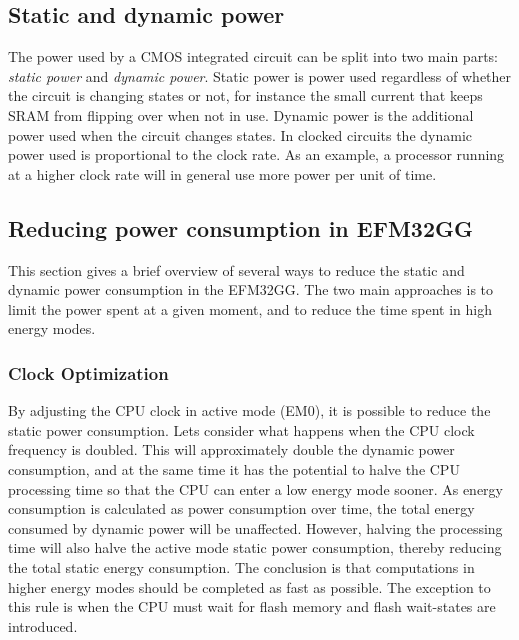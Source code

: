 \subsection{Static and dynamic power}
The power used by a CMOS integrated circuit can be split into two main parts: \emph{static power} and \emph{dynamic power}. Static power is power used regardless of whether the circuit is changing states or not, for instance the small current that keeps SRAM from flipping over when not in use. Dynamic power is the additional power used when the circuit changes states. In clocked circuits the dynamic power used is proportional to the clock rate. As an example, a processor running at a higher clock rate will in general use more power per unit of time.\cite{efm32-energy-optimization}

%

\subsection{Reducing power consumption in EFM32GG}
This section gives a brief overview of several ways to reduce the static and dynamic power consumption in the EFM32GG. The two main approaches is to limit the power spent at a given moment, and to reduce the time spent in high energy modes.

\subsubsection{Clock Optimization}
By adjusting the CPU clock in active mode (EM0), it is possible to reduce the static power consumption. Lets consider what happens when the CPU clock frequency is doubled. This will approximately double the dynamic power consumption, and at the same time it has the potential to halve the CPU processing time so that the CPU can enter a low energy mode sooner. As energy consumption is calculated as power consumption over time, the total energy consumed by dynamic power will be unaffected. However, halving the processing time will also halve the active mode static power consumption, thereby reducing the total static energy consumption. The conclusion is that computations in higher energy modes should be completed as fast as possible. The exception to this rule is when the CPU must wait for flash memory and flash wait-states are introduced.\cite{efm32-energy-optimization}

